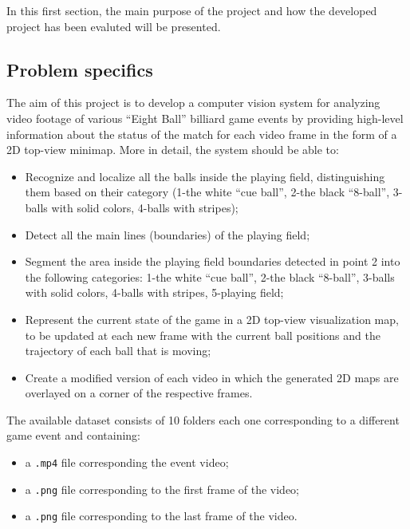 In this first section, the main purpose of the project and how the developed project has been evaluted will be presented.


\subsection{Problem specifics}
The aim of this project is to develop a computer vision system for analyzing video footage of various “Eight Ball”
billiard game events by providing high-level information about the status of the match for each video frame in the form of a 
2D top-view minimap.
\newline
More in detail, the system should be able to:
\begin{itemize}
    \item Recognize and localize all the balls inside the playing field, distinguishing them based on their category (1-the
    white “cue ball”, 2-the black “8-ball”, 3-balls with solid colors, 4-balls with stripes);
    \item Detect all the main lines (boundaries) of the playing field;
    \item Segment the area inside the playing field boundaries detected in point 2 into the following categories: 1-the
    white “cue ball”, 2-the black “8-ball”, 3-balls with solid colors, 4-balls with stripes, 5-playing field;
    \item Represent the current state of the game in a 2D top-view visualization map, to be updated at each new frame
    with the current ball positions and the trajectory of each ball that is moving;
    \item Create a modified version of each video in which the generated 2D maps are 
    overlayed on a corner of the respective frames.
\end{itemize}

\begin{flushleft}
The available dataset consists of 10 folders each one corresponding to a different game event and containing:
\end{flushleft}
\begin{itemize}
    \item a \verb|.mp4| file corresponding the event video;
    \item a \verb|.png| file corresponding to the first frame of the video;
    \item a \verb|.png| file corresponding to the last frame of the video.
\end{itemize}

